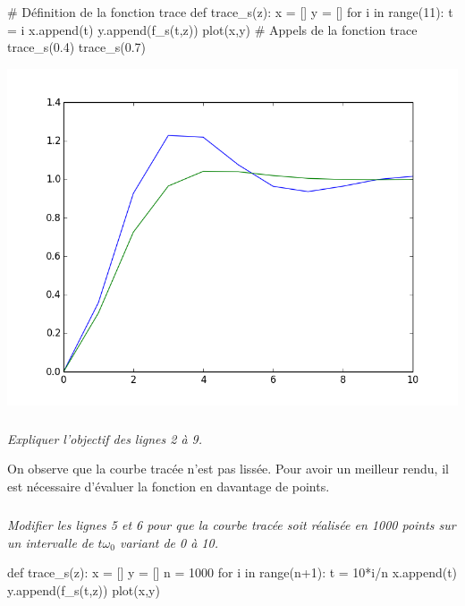 \documentclass[10pt]{article}
\begin{document}
\begin{minipage}[c]{.48\linewidth}
\begin{py}
\begin{python}
# Définition de la fonction trace
def trace_s(z):
    x = []
    y = []
    for i in range(11):
        t = i
        x.append(t)
        y.append(f_s(t,z))
    plot(x,y)
# Appels de la fonction trace
trace_s(0.4)
trace_s(0.7)

\end{python}
\end{py}
\end{minipage} \hfill
\begin{minipage}[c]{.48\linewidth}
\begin{center}
\includegraphics[width=\textwidth]{images/courbe}
\end{center}
\end{minipage}

\subparagraph{}
\textit{Expliquer l'objectif des lignes 2 à 9.}

\vspace{.25cm}

On observe que la courbe tracée n'est pas lissée. Pour avoir un meilleur rendu, il est nécessaire d'évaluer la fonction en davantage de points. 

\subparagraph{}
\textit{Modifier les lignes 5 et 6 pour que la courbe tracée soit réalisée en 1000 points sur un intervalle de $t \omega_0$ variant de 0 à 10. }

\begin{corrige}
\begin{py}
\begin{python}
def trace_s(z):
    x = []
    y = []
    n = 1000
    for i in range(n+1):
        t = 10*i/n
        x.append(t)
        y.append(f_s(t,z))
    plot(x,y)
\end{python}
\end{py}
\end{corrige}
\end{document}

